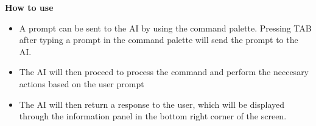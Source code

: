 \documentclass[11pt,a4paper]{article}
\begin{document}
\textbf{How to use}

\begin{itemize}
  \item[\textbullet] A prompt can be sent to the AI by using the command palette. Pressing TAB after typing a prompt in the command palette will send the prompt to the AI.
  \item[\textbullet] The AI will then proceed to process the command and perform the neccesary actions based on the user prompt
  \item[\textbullet] The AI will then return a response to the user, which will be displayed through the information panel in the bottom right corner of the screen.
\end{itemize}
\end{document}

